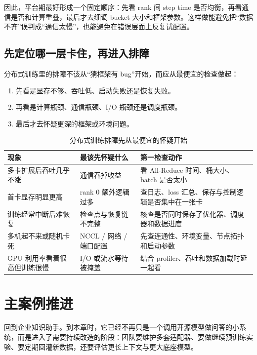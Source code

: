 因此，平台期最好形成一个固定顺序：先看 rank 间 step time 是否均衡，再看通信是否和计算重叠，最后才去细调 bucket 大小和框架参数。这样做能避免把“数据不齐”误判成“通信太慢”，也能避免在错误层面上反复试配置。

\subsection{先定位哪一层卡住，再进入排障}
分布式训练里的排障不该从“猜框架有 bug”开始，而应从最便宜的检查做起：
\begin{enumerate}
  \item 先看是显存不够、吞吐低、启动失败还是恢复失败。
  \item 再看是计算瓶颈、通信瓶颈、I/O 瓶颈还是调度瓶颈。
  \item 最后才去怀疑更深的框架或环境问题。
\end{enumerate}

\begin{table}[H]
\centering
\small
\begin{tabularx}{\textwidth}{>{\raggedright\arraybackslash}p{3.2cm}>{\raggedright\arraybackslash}p{3.3cm}>{\raggedright\arraybackslash}X}
\toprule
\textbf{现象} & \textbf{最该先怀疑什么} & \textbf{第一检查动作} \\
\midrule
多卡扩展后吞吐几乎不涨 & 通信吞掉收益 & 看 All-Reduce 时间、桶大小、batch 是否太小 \\
首卡显存明显更高 & rank 0 额外逻辑过多 & 查日志、loss 汇总、保存与控制逻辑是否集中在一张卡 \\
训练经常中断后难恢复 & 检查点与恢复链不完整 & 核查是否同时保存了优化器、调度器和数据进度 \\
多机起不来或随机卡死 & NCCL / 网络 / 端口配置 & 先查连通性、环境变量、节点拓扑和启动参数 \\
GPU 利用率看着很高但训练很慢 & I/O 或流水等待被掩盖 & 结合 profiler、吞吐和数据加载时延一起看 \\
\bottomrule
\end{tabularx}
\caption{分布式训练排障先从最便宜的怀疑开始}
\label{tab:distributed-diagnosis}
\end{table}

\section{主案例推进}
回到企业知识助手。到本章时，它已经不再只是一个调用开源模型做问答的小系统，而是进入了需要持续改造的阶段：团队要维护多套适配器、要做继续预训练实验、要定期回灌新数据，还要评估更长上下文与更大底座模型。

